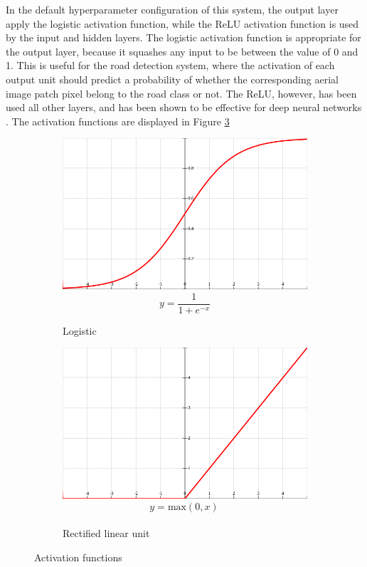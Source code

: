 In the default hyperparameter configuration of this system, the output layer apply the logistic activation function, while the \ac{ReLU} activation function is used by the input and hidden layers. The logistic activation function is appropriate for the output layer, because it squashes any input to be between the value of 0 and 1. This is useful for the road detection system, where the activation of each output unit should predict a probability of whether the corresponding aerial image patch pixel belong to the road class or not. The \ac{ReLU}, however, has been used all other layers, and has been shown to be effective for deep neural networks .  The activation functions are displayed in Figure \ref{fig:activation_functions}\\

\begin{figure}[h]
\begin{subfigure}{0.45\textwidth}
\includegraphics[width=\linewidth]{figs/sigmoid2.png}
$$ y = \frac{1}{1+ e^{-x}}$$
\caption{Logistic} \label{fig:activation_sigmoid}
\end{subfigure}
\hspace*{\fill} %
\begin{subfigure}{0.45\textwidth}
\includegraphics[width=\linewidth]{figs/relu2.png}
$$ y = \text{max}(0, x) \frac{}{}$$
\caption{Rectified linear unit} \label{fig:activation_relu}
\end{subfigure}
\hspace*{\fill} %
\caption{Activation functions} \label{fig:activation_functions}
\end{figure}


